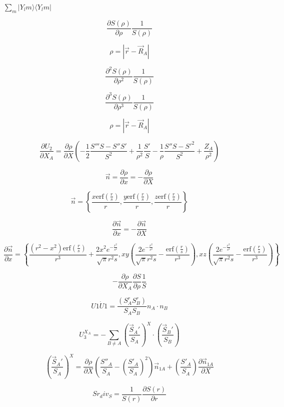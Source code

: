 \documentclass{article}
\begin{document}
$\sum_m |Y_lm \rangle \langle Y_lm|$
\pagebreak

\[ \frac{\partial S(\rho)}{\partial \rho} \frac{1}{S(\rho)} \]
\pagebreak

\[ \rho = |\vec r - \vec R_A | \]
\pagebreak

\[ \frac{\partial^2 S(\rho)}{\partial \rho^2} \frac{1}{S(\rho)} \]
\pagebreak

\[ \frac{\partial^3 S(\rho)}{\partial \rho^3} \frac{1}{S(\rho)} \]
\pagebreak

\[ \rho = \left| \vec r- \vec R_A \right| \]
\pagebreak

\[ \frac{\partial U_2}{\partial X_A} = \frac{\partial \rho}{\partial X} \left(-\frac{1}{2}\frac{S''' S - S'' S'}{S^2} + \frac{1}{\rho^2}\frac{S'}{S} - \frac{1}{\rho} \frac{S''S - S'^2}{S^2} + \frac{Z_A}{\rho^2}\right) \]
\pagebreak

\[ \vec n = \frac{\partial \rho}{\partial x} = -\frac{\partial \rho}{\partial X} \]
\pagebreak

\[ \vec n = \left\{\frac{x \mathrm{erf}\left(\frac{r}{s}\right)}{r}, \frac{y \mathrm{erf}\left(\frac{r}{s}\right)}{r}, \frac{z \mathrm{erf}\left(\frac{r}{s}\right)}{r}\right\} \]
\pagebreak

\[ \frac{\partial \vec n}{\partial x} = -\frac{\partial \vec n}{\partial X} \]
\pagebreak

\[ \frac{\partial\vec n}{\partial x} = \left\{\frac{\left(r^2-x^2\right) \mathrm{erf}\left(\frac{r}{s}\right)}{r^3} +\frac{2 x^2 e^{-\frac{r^2}{s^2}}}{\sqrt{\pi } r^2 s}, x y \left(\frac{2 e^{-\frac{r^2}{s^2}}}{\sqrt{\pi } r^2 s} -\frac{\mathrm{erf}\left(\frac{r}{s}\right)}{r^3}\right), x z \left(\frac{2 e^{-\frac{r^2}{s^2}}}{\sqrt{\pi } r^2 s} -\frac{\mathrm{erf}\left(\frac{r}{s}\right)}{r^3}\right)\right\} \]
\pagebreak

\[ -\frac{\partial \rho}{\partial X_A}\frac{\partial S}{\partial \rho}\frac{1}{S} \]
\pagebreak

\[ U1\dot U1 = \frac{\left(S^r_A S^r_B\right)}{S_A S_B} n_A \cdot n_B \]
\pagebreak

\[ U_3^{X_A} = -\sum_{B\neq A}\left(\frac{\vec S_A'}{S_A}\right)^X\cdot\left(\frac{\vec S_B'}{S_B}\right) \]
\pagebreak

\[ \left(\frac{\vec S_A'}{S_A}\right)^X = \frac{\partial \rho}{\partial X}\left(\frac{S''_A}{S_A} -\left(\frac{S'_A}{S_A}\right)^2\right)\vec n_{1A} + \left(\frac{S'_A}{S_A}\right)\frac{\partial \vec n_{1A}}{\partial X} \]
\pagebreak

\[ Sr_div_S = \frac{1}{S(r)}\frac{\partial S(r)}{\partial r} \]
\pagebreak
\end{document}
